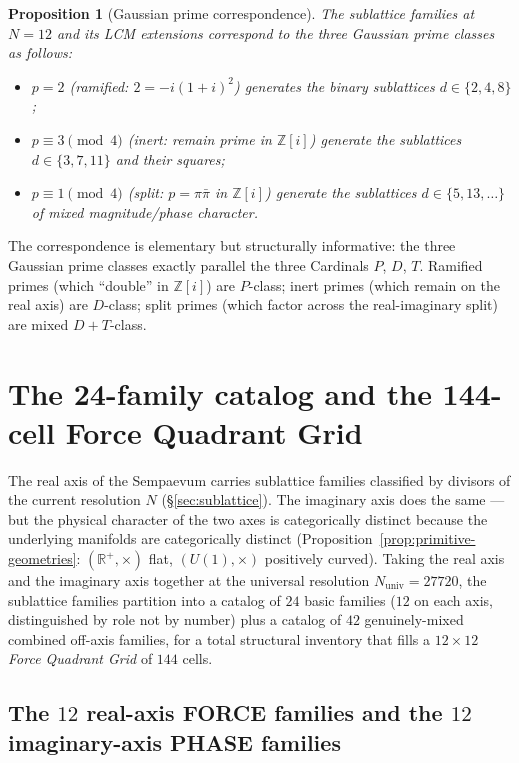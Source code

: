 \documentclass[11pt,a4paper]{article}
\newtheorem{proposition}[theorem]{Proposition}
\theoremstyle{definition}
\theoremstyle{remark}
\newcommand{\R}{\mathbb{R}}
\newcommand{\Z}{\mathbb{Z}}
\begin{document}
\begin{proposition}[Gaussian prime correspondence]\label{prop:gaussian}
The sublattice families at $N=12$ and its LCM extensions correspond to the three Gaussian prime classes as follows:
\begin{itemize}[leftmargin=*]
\item $p=2$ (ramified: $2=-i(1+i)^{2}$) generates the binary sublattices $d\in\{2,4,8\}$;
\item $p\equiv 3\pmod 4$ (inert: remain prime in $\Z[i]$) generate the sublattices $d\in\{3,7,11\}$ and their squares;
\item $p\equiv 1\pmod 4$ (split: $p=\pi\bar\pi$ in $\Z[i]$) generate the sublattices $d\in\{5,13,\ldots\}$ of mixed magnitude/phase character.
\end{itemize}
\end{proposition}

The correspondence is elementary but structurally informative: the three Gaussian prime classes exactly parallel the three Cardinals $P$, $D$, $T$. Ramified primes (which ``double'' in $\Z[i]$) are $P$-class; inert primes (which remain on the real axis) are $D$-class; split primes (which factor across the real-imaginary split) are mixed $D{+}T$-class.

\section{The 24-family catalog and the 144-cell Force Quadrant Grid}\label{sec:catalog}

The real axis of the Sempaevum carries sublattice families classified by divisors of the current resolution $N$ (\S\ref{sec:sublattice}). The imaginary axis does the same --- but the physical character of the two axes is categorically distinct because the underlying manifolds are categorically distinct (Proposition~\ref{prop:primitive-geometries}: $(\R^{+},\times)$ flat, $(U(1),\times)$ positively curved). Taking the real axis and the imaginary axis together at the universal resolution $N_{\text{univ}} = 27720$, the sublattice families partition into a catalog of $24$ basic families ($12$ on each axis, distinguished by role not by number) plus a catalog of $42$ genuinely-mixed combined off-axis families, for a total structural inventory that fills a $12\times 12$ \emph{Force Quadrant Grid} of $144$ cells.

\subsection{The $12$ real-axis FORCE families and the $12$ imaginary-axis PHASE families}\label{subsec:24-families}
\end{document}
